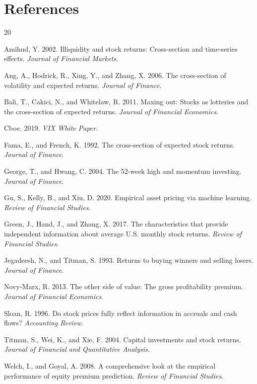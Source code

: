 \documentclass[11pt,a4paper]{article}
\begin{document}

\section{References}

\begin{thebibliography}{20}

Amihud, Y. 2002.
Illiquidity and stock returns: Cross-section and time-series effects.
\textit{Journal of Financial Markets}.

Ang, A., Hodrick, R., Xing, Y., and Zhang, X. 2006.
The cross-section of volatility and expected returns.
\textit{Journal of Finance}.

Bali, T., Cakici, N., and Whitelaw, R. 2011.
Maxing out: Stocks as lotteries and the cross-section of expected returns.
\textit{Journal of Financial Economics}.

Cboe. 2019.
\textit{VIX White Paper}.

Fama, E., and French, K. 1992.
The cross-section of expected stock returns.
\textit{Journal of Finance}.

George, T., and Hwang, C. 2004.
The 52-week high and momentum investing.
\textit{Journal of Finance}.

Gu, S., Kelly, B., and Xiu, D. 2020.
Empirical asset pricing via machine learning.
\textit{Review of Financial Studies}.

Green, J., Hand, J., and Zhang, X. 2017.
The characteristics that provide independent information about average
U.S. monthly stock returns.
\textit{Review of Financial Studies}.

Jegadeesh, N., and Titman, S. 1993.
Returns to buying winners and selling losers.
\textit{Journal of Finance}.

Novy-Marx, R. 2013.
The other side of value: The gross profitability premium.
\textit{Journal of Financial Economics}.

Sloan, R. 1996.
Do stock prices fully reflect information in accruals and cash flows?
\textit{Accounting Review}.

Titman, S., Wei, K., and Xie, F. 2004.
Capital investments and stock returns.
\textit{Journal of Financial and Quantitative Analysis}.

Welch, I., and Goyal, A. 2008.
A comprehensive look at the empirical performance of equity premium prediction.
\textit{Review of Financial Studies}.

\end{thebibliography}
\end{document}
